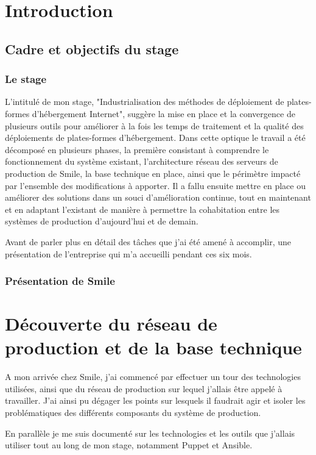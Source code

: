 \documentclass[12 pt]{report}
\begin{document}
\chapter{Introduction}

\section{Cadre et objectifs du stage}

\subsection{Le stage}L'intitulé de mon stage, "Industrialisation des méthodes de déploiement de plates-formes d'hébergement Internet", suggère la mise en place et la convergence de plusieurs outils pour améliorer à la fois les temps de traitement et la qualité des déploiements de plates-formes d'hébergement. Dans cette optique le travail a été décomposé en plusieurs phases, la première consistant à comprendre le fonctionnement du système existant, l'architecture réseau des serveurs de production de Smile, la base technique en place, ainsi que le périmètre impacté par l'ensemble des modifications à apporter. Il a fallu ensuite mettre en place ou améliorer des solutions dans un souci d'amélioration continue, tout en maintenant et en adaptant l'existant de manière à permettre la cohabitation entre les systèmes de production d'aujourd'hui et de demain.

Avant de parler plus en détail des tâches que j'ai été amené à accomplir, une présentation de l'entreprise qui m'a accueilli pendant ces six mois.

\subsection{Présentation de Smile}
\lipsum

\chapter{Découverte du réseau de production et de la base technique}

A mon arrivée chez Smile, j'ai commencé par effectuer un tour des technologies utilisées, ainsi que du réseau de production sur lequel j'allais être appelé à travailler. J'ai ainsi pu dégager les points sur lesquels il faudrait agir et isoler les problématiques des différents composants du système de production.

En parallèle je me suis documenté sur les technologies et les outils que j'allais utiliser tout au long de mon stage, notamment Puppet et Ansible.
\end{document}

